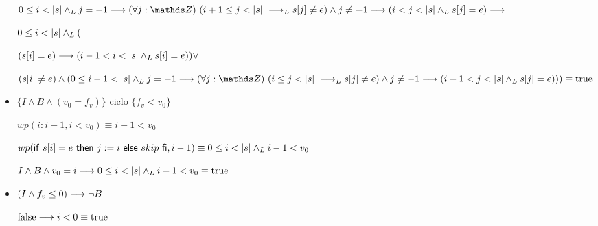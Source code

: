 \documentclass{article}
\begin{document}
\begin{itemize}
    $0 \leq i < \longitud{s} \yLuego j = -1 \implica \paraTodo{j}{(i+1}{\longitud{s}} \implicaLuego s[j] \neq e) \wedge j \neq -1 \implica (i < j < \longitud{s} \yLuego s[j]=e) \implica$

    $0 \leq i < |s| \land _L ( $
    
    $(s[i] = e) \longrightarrow (i-1 < i < |s| \land _L s[i]=e) ) \vee$

    $(s[i] \neq e) \wedge ( 0 \leq i-1 < \longitud{s} \yLuego j = -1 \implica \paraTodo{j}{(i}{\longitud{s}} \implicaLuego s[j] \neq e) \wedge j \neq -1 \implica (i-1 < j < \longitud{s} \yLuego s[j]=e))) \equiv \True$

    \item $\{I \wedge B \wedge (v_{0} = f_{v})\}$ ciclo $\{f_{v} < v_{0}\}$
    
    $wp(i:i-1, i<v_{0}) \equiv i-1<v_{0}$

    $wp(\mathsf{if}\ s[i]=e\ \mathsf{then}\ j:=i\ \mathsf{else}\ skip\ \mathsf{fi}, i-1) \equiv 0 \leq i < |s| \land _L i-1<v_{0}$

    $I \wedge B \wedge v_{0} = i \longrightarrow 0 \leq i < |s| \land _L i-1<v_{0} \equiv \mathrm{true}$

    \item $(I \wedge f_{v} \leq 0) \longrightarrow \neg B$

    $\mathrm{false} \longrightarrow i < 0 \equiv \mathrm{true}$
\end{itemize}
\end{document}
